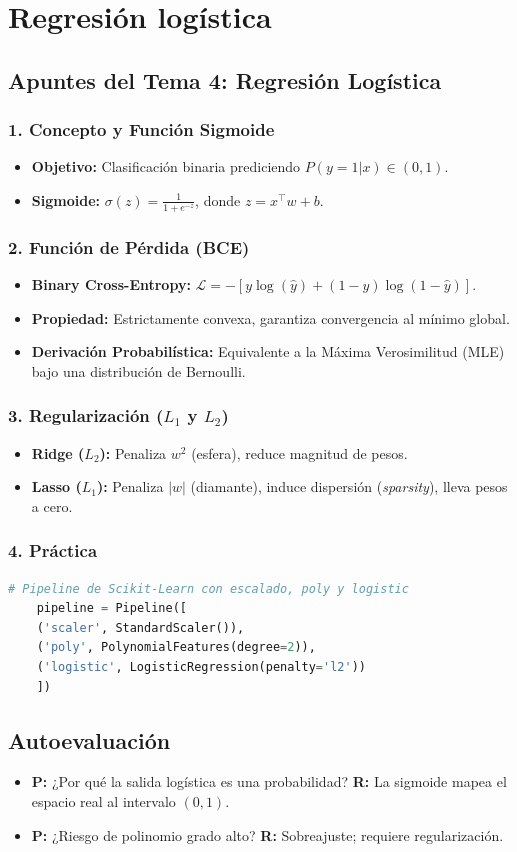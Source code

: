 \chapter{Regresión logística}

\section{Apuntes del Tema 4: Regresión Logística}

\subsection{1. Concepto y Función Sigmoide}
\begin{itemize}
	\item \textbf{Objetivo:} Clasificación binaria prediciendo $P(y=1|x) \in (0,1)$.
	\item \textbf{Sigmoide:} $\sigma(z) = \frac{1}{1 + e^{-z}}$, donde $z = x^\top w + b$.
\end{itemize}

\subsection{2. Función de Pérdida (BCE)}
\begin{itemize}
	\item \textbf{Binary Cross-Entropy:} $\mathcal{L} = - [ y \log(\hat{y}) + (1 - y) \log(1 - \hat{y}) ]$.
	\item \textbf{Propiedad:} Estrictamente convexa, garantiza convergencia al mínimo global.
	\item \textbf{Derivación Probabilística:} Equivalente a la Máxima Verosimilitud (MLE) bajo una distribución de Bernoulli.
\end{itemize}

\subsection{3. Regularización ($L_1$ y $L_2$)}
\begin{itemize}
	\item \textbf{Ridge ($L_2$):} Penaliza $w^2$ (esfera), reduce magnitud de pesos.
	\item \textbf{Lasso ($L_1$):} Penaliza $|w|$ (diamante), induce dispersión (\emph{sparsity}), lleva pesos a cero.
\end{itemize}

\subsection{4. Práctica}
\begin{lstlisting}[language=Python]
	# Pipeline de Scikit-Learn con escalado, poly y logistic
	pipeline = Pipeline([
	('scaler', StandardScaler()),
	('poly', PolynomialFeatures(degree=2)),
	('logistic', LogisticRegression(penalty='l2'))
	])
\end{lstlisting}

\section{Autoevaluación}
\begin{itemize}
	\item \textbf{P:} ¿Por qué la salida logística es una probabilidad? \textbf{R:} La sigmoide mapea el espacio real al intervalo $(0,1)$.
	\item \textbf{P:} ¿Riesgo de polinomio grado alto? \textbf{R:} Sobreajuste; requiere regularización.
\end{itemize}